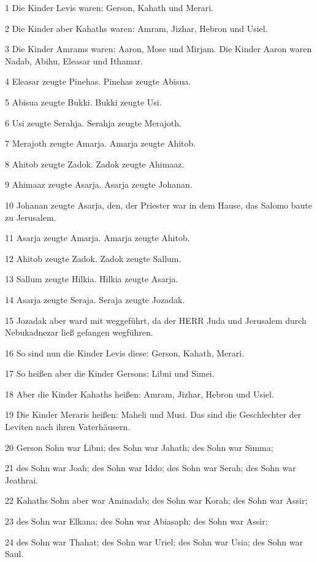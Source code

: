 \par 1 Die Kinder Levis waren: Gerson, Kahath und Merari.
\par 2 Die Kinder aber Kahaths waren: Amram, Jizhar, Hebron und Usiel.
\par 3 Die Kinder Amrams waren: Aaron, Mose und Mirjam. Die Kinder Aaron waren Nadab, Abihu, Eleasar und Ithamar.
\par 4 Eleasar zeugte Pinehas. Pinehas zeugte Abisua.
\par 5 Abisua zeugte Bukki. Bukki zeugte Usi.
\par 6 Usi zeugte Serahja. Serahja zeugte Merajoth.
\par 7 Merajoth zeugte Amarja. Amarja zeugte Ahitob.
\par 8 Ahitob zeugte Zadok. Zadok zeugte Ahimaaz.
\par 9 Ahimaaz zeugte Asarja. Asarja zeugte Johanan.
\par 10 Johanan zeugte Asarja, den, der Priester war in dem Hause, das Salomo baute zu Jerusalem.
\par 11 Asarja zeugte Amarja. Amarja zeugte Ahitob.
\par 12 Ahitob zeugte Zadok. Zadok zeugte Sallum.
\par 13 Sallum zeugte Hilkia. Hilkia zeugte Asarja.
\par 14 Asarja zeugte Seraja. Seraja zeugte Jozadak.
\par 15 Jozadak aber ward mit weggeführt, da der HERR Juda und Jerusalem durch Nebukadnezar ließ gefangen wegführen.
\par 16 So sind nun die Kinder Levis diese: Gerson, Kahath, Merari.
\par 17 So heißen aber die Kinder Gersons: Libni und Simei.
\par 18 Aber die Kinder Kahaths heißen: Amram, Jizhar, Hebron und Usiel.
\par 19 Die Kinder Meraris heißen: Maheli und Musi. Das sind die Geschlechter der Leviten nach ihren Vaterhäusern.
\par 20 Gerson Sohn war Libni; des Sohn war Jahath; des Sohn war Simma;
\par 21 des Sohn war Joah; des Sohn war Iddo; des Sohn war Serah; des Sohn war Jeathrai.
\par 22 Kahaths Sohn aber war Aminadab; des Sohn war Korah; des Sohn war Assir;
\par 23 des Sohn war Elkana; des Sohn war Abiasaph; des Sohn war Assir;
\par 24 des Sohn war Thahat; des Sohn war Uriel; des Sohn war Usia; des Sohn war Saul.

